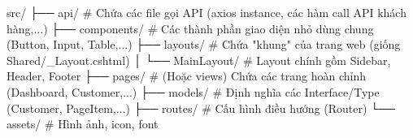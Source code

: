 src/
├── api/             # Chứa các file gọi API (axios instance, các hàm call API khách hàng,...)
├── components/      # Các thành phần giao diện nhỏ dùng chung (Button, Input, Table,...)
├── layouts/         # Chứa "khung" của trang web (giống Shared/_Layout.cshtml)
│   └── MainLayout/  # Layout chính gồm Sidebar, Header, Footer
├── pages/           # (Hoặc views) Chứa các trang hoàn chỉnh (Dashboard, Customer,...)
├── models/          # Định nghĩa các Interface/Type (Customer, PageItem,...)
├── routes/          # Cấu hình điều hướng (Router)
└── assets/          # Hình ảnh, icon, font